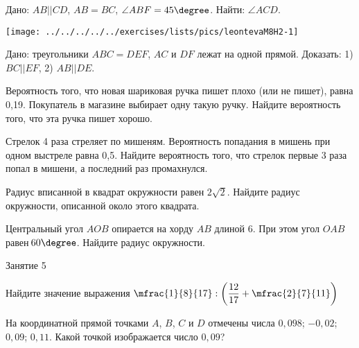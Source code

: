 \begin{homework}[number=2]
	\begin{listofex}
		\item 
		\begin{minipage}[t]{\bodywidth}
			Дано: \( AB || CD \), \( AB = BC \), \( \angle ABF = 45\degree \). Найти: \( \angle ACD \).
		\end{minipage}
		\hspace{0.02\linewidth}
		\begin{minipage}[t]{\picwidth}
			\texttt{[image: ../../../../../exercises/lists/pics/leontevaM8H2-1]}
		\end{minipage}
		\item Дано: треугольники \( ABC = DEF \), \( AC \) и \( DF \) лежат на одной прямой. Доказать: 1) \( BC || EF \), 2) \( AB || DE \).
		\item Вероятность того, что новая шариковая ручка пишет плохо (или не пишет), равна 0,19. Покупатель в магазине выбирает одну такую ручку. Найдите вероятность того, что эта ручка пишет хорошо.
		\item Стрелок 4 раза стреляет по мишеням. Вероятность попадания в мишень при одном выстреле равна 0,5. Найдите вероятность того, что стрелок первые 3 раза попал в мишени, а последний раз промахнулся.
		\item  Радиус вписанной в квадрат окружности равен \( 2\sqrt{2}  \). Найдите радиус окружности, описанной около этого квадрата.
		\item Центральный угол \( AOB \) опирается на хорду \( AB \) длиной 6. При этом угол \( OAB \) равен \( 60\degree \). Найдите радиус окружности.
	\end{listofex}
\end{homework}

\begin{class}[number=5]
	\begin{listofex}
		\item Занятие 5
	\end{listofex}
\end{class}

\begin{class}[number=6]
	\begin{listofex}
		\item Найдите значение выражения \( \mfrac{1}{8}{17}:\left( \dfrac{12}{17}+\mfrac{2}{7}{11} \right) \)
		\item На координатной прямой точками \( A \), \( B \), \( C \) и \( D \) отмечены числа \( 0,098 \); \( -0,02 \); \( 0,09 \); \( 0,11 \). Какой точкой изображается число \( 0,09 \)? 
	\end{listofex}
\end{class}

